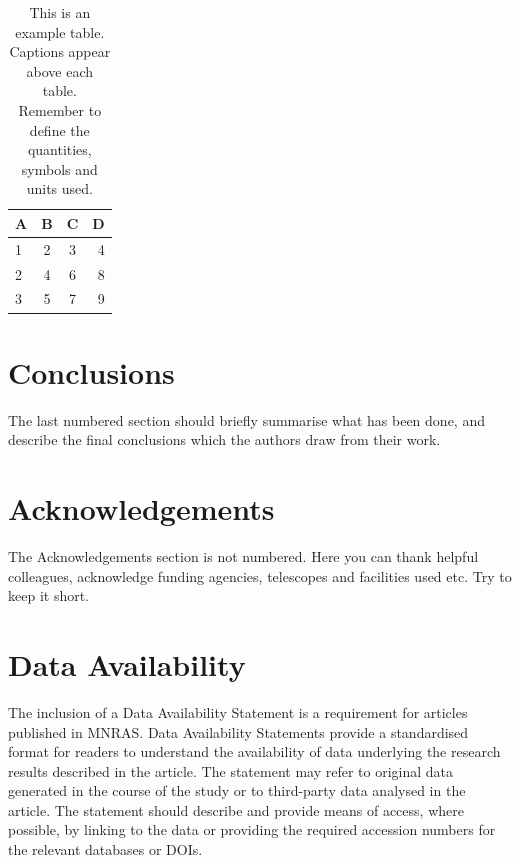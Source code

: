 \documentclass[fleqn,usenatbib]{mnras}
\begin{document}
\begin{table}
	\centering
	\caption{This is an example table. Captions appear above each table.
	Remember to define the quantities, symbols and units used.}
	\label{tab:example_table}
	\begin{tabular}{lccr} %
		\hline
		A & B & C & D\\
		\hline
		1 & 2 & 3 & 4\\
		2 & 4 & 6 & 8\\
		3 & 5 & 7 & 9\\
		\hline
	\end{tabular}
\end{table}


\section{Conclusions}

The last numbered section should briefly summarise what has been done, and describe
the final conclusions which the authors draw from their work.

\section*{Acknowledgements}

The Acknowledgements section is not numbered. Here you can thank helpful
colleagues, acknowledge funding agencies, telescopes and facilities used etc.
Try to keep it short.

\section*{Data Availability}

 
The inclusion of a Data Availability Statement is a requirement for articles published in MNRAS. Data Availability Statements provide a standardised format for readers to understand the availability of data underlying the research results described in the article. The statement may refer to original data generated in the course of the study or to third-party data analysed in the article. The statement should describe and provide means of access, where possible, by linking to the data or providing the required accession numbers for the relevant databases or DOIs.




\end{document}

